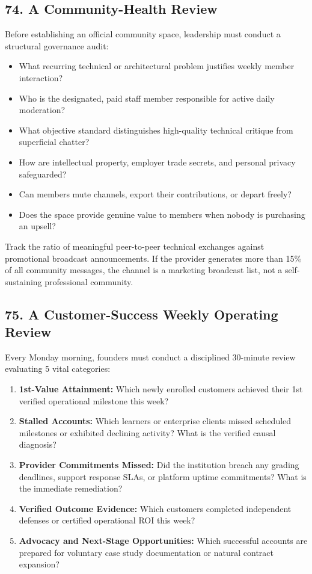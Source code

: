 \subsection*{74. A Community-Health Review}

Before establishing an official community space, leadership must conduct a structural governance audit:
\begin{itemize}[leftmargin=*]
\item What recurring technical or architectural problem justifies weekly member interaction?
\item Who is the designated, paid staff member responsible for active daily moderation?
\item What objective standard distinguishes high-quality technical critique from superficial chatter?
\item How are intellectual property, employer trade secrets, and personal privacy safeguarded?
\item Can members mute channels, export their contributions, or depart freely?
\item Does the space provide genuine value to members when nobody is purchasing an upsell?
\end{itemize}

Track the ratio of meaningful peer-to-peer technical exchanges against promotional broadcast announcements. If the provider generates more than 15\% of all community messages, the channel is a marketing broadcast list, not a self-sustaining professional community.

\subsection*{75. A Customer-Success Weekly Operating Review}

Every Monday morning, founders must conduct a disciplined 30-minute review evaluating 5 vital categories:
\begin{enumerate}[leftmargin=*]
\item \textbf{1st-Value Attainment:} Which newly enrolled customers achieved their 1st verified operational milestone this week?
\item \textbf{Stalled Accounts:} Which learners or enterprise clients missed scheduled milestones or exhibited declining activity? What is the verified causal diagnosis?
\item \textbf{Provider Commitments Missed:} Did the institution breach any grading deadlines, support response SLAs, or platform uptime commitments? What is the immediate remediation?
\item \textbf{Verified Outcome Evidence:} Which customers completed independent defenses or certified operational ROI this week?
\item \textbf{Advocacy and Next-Stage Opportunities:} Which successful accounts are prepared for voluntary case study documentation or natural contract expansion?
\end{enumerate}

